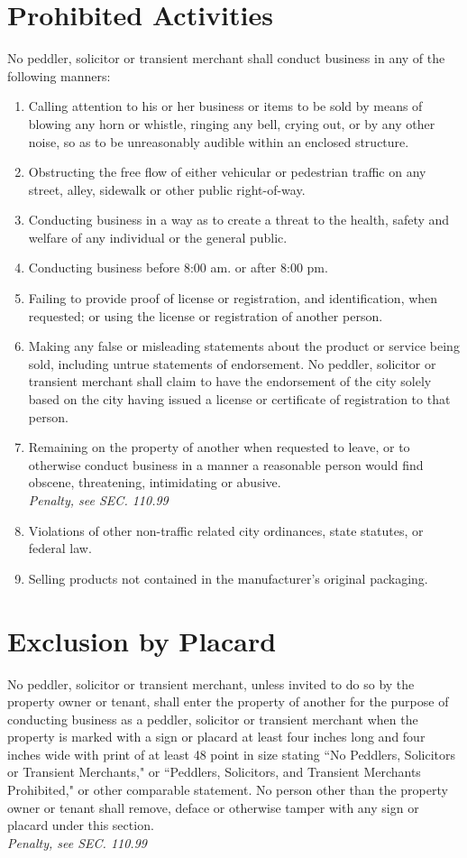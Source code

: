 \section{Prohibited Activities}
No peddler, solicitor or transient merchant shall conduct business in any of the following manners:
\begin{enumerate}[{\indent}A)]
    \item Calling attention to his or her business or items to be sold by means of blowing any horn or whistle, ringing any bell, crying out, or by any other noise, so as to be unreasonably audible within an enclosed structure.
    \item Obstructing the free flow of either vehicular or pedestrian traffic on any street, alley, sidewalk or other public right-of-way.
    \item Conducting business in a way as to create a threat to the health, safety and welfare of any individual or the general public.
    \item Conducting business before 8:00 am. or after 8:00 pm.
    \item Failing to provide proof of license or registration, and identification, when requested; or using the license or registration of another person.
    \item Making any false or misleading statements about the product or service being sold, including untrue statements of endorsement. No peddler, solicitor or transient merchant shall claim to have the endorsement of the city solely based on the city having issued a license or certificate of registration to that person.
    \item Remaining on the property of another when requested to leave, or to otherwise conduct business in a manner a reasonable person would find obscene, threatening, intimidating or abusive.\\
        \emph{Penalty, see SEC. 110.99}
    \item Violations of other non-traffic related city ordinances, state statutes, or federal law.
    \item Selling products not contained in the manufacturer's original packaging.
\end{enumerate}

\section{Exclusion by Placard}
No peddler, solicitor or transient merchant, unless invited to do so by the property owner or tenant, shall enter the property of another for the purpose of conducting business as a peddler, solicitor or transient merchant when the property is marked with a sign or placard at least four inches long and four inches wide with print of at least 48 point in size stating “No Peddlers, Solicitors or Transient Merchants," or “Peddlers, Solicitors, and Transient Merchants Prohibited," or other comparable statement. No person other than the property owner or tenant shall remove, deface or otherwise tamper with any sign or placard under this section.\\
\emph{Penalty, see SEC. 110.99}

